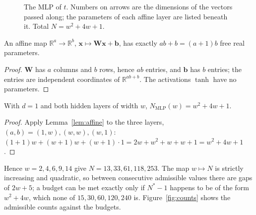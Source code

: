 \documentclass[11pt,a4paper]{article}
\newcommand{\R}{\mathbb R}
\begin{document}
\begin{figure}[H]\centering
{}
\caption{The MLP of $t$. Numbers on arrows are the dimensions of the vectors passed along; the parameters of each affine layer are listed beneath it. Total $N=w^2+4w+1$.}
\label{fig:arch}
\end{figure}

\begin{lemma}\label{lem:affine}
An affine map $\R^a\to\R^b$, $\bm x\mapsto \bm W\bm x+\bm b$, has exactly $ab+b=(a+1)b$ free real parameters.
\end{lemma}
\begin{proof}
$\bm W$ has $a$ columns and $b$ rows, hence $ab$ entries, and $\bm b$ has $b$ entries; the entries are independent coordinates of $\R^{ab+b}$. The activations $\tanh$ have no parameters.
\end{proof}

\begin{proposition}\label{prop:mlp}
With $d=1$ and both hidden layers of width $w$, $N_{\mathrm{MLP}}(w)=w^2+4w+1$.
\end{proposition}
\begin{proof}
Apply Lemma~\ref{lem:affine} to the three layers, $(a,b)=(1,w),(w,w),(w,1)$: $(1+1)w+(w+1)w+(w+1)\cdot1=2w+w^2+w+w+1=w^2+4w+1$.
\end{proof}
Hence $w=2,4,6,9,14$ give $N=13,33,61,118,253$. The map $w\mapsto N$ is strictly increasing and quadratic, so between consecutive admissible values there are gaps of $2w+5$; a budget can be met exactly only if $N^*-1$ happens to be of the form $w^2+4w$, which none of $15,30,60,120,240$ is. Figure~\ref{fig:counts} shows the admissible counts against the budgets.
\end{document}
